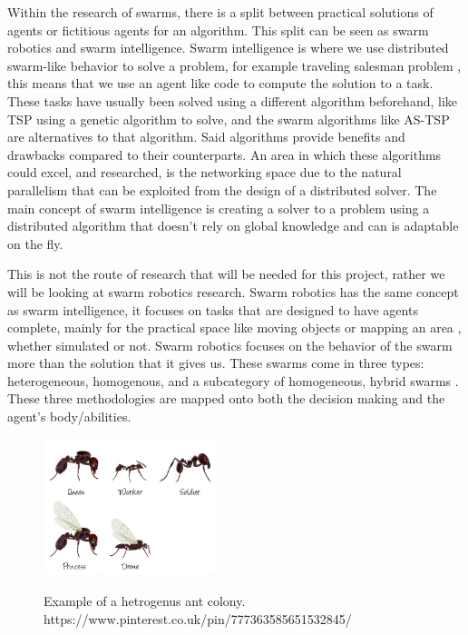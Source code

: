 \documentclass{UoYCSproject}
\begin{document}
Within the research of swarms, there is a split between practical solutions of agents or fictitious agents for an algorithm. 
This split can be seen as swarm robotics and swarm intelligence.
Swarm intelligence is where we use distributed swarm-like behavior to solve a problem, for example traveling salesman problem \cite{Swarm intellegiegence}, this means that we use an agent like code to compute the solution to a task.
These tasks have usually been solved using a different algorithm beforehand, like TSP using a genetic algorithm to solve, and the swarm algorithms like AS-TSP \cite{Swarm intellegiegence} are alternatives to that algorithm.
Said algorithms provide benefits and drawbacks compared to their counterparts. 
An area in which these algorithms could excel, and researched, is the networking space \cite{Swarm intellegiegence} due to the natural parallelism that can be exploited from the design of a distributed solver.
The main concept of swarm intelligence is creating a solver to a problem using a distributed algorithm that doesn't rely on global knowledge and can is adaptable on the fly.

This is not the route of research that will be needed for this project, rather we will be looking at swarm robotics research.
Swarm robotics has the same concept as swarm intelligence, it focuses on tasks that are designed to have agents complete, mainly for the practical space like moving objects or mapping an area \cite{Cognitive maps mine detection, Probabalitic automata foraging robots}, whether simulated or not.
Swarm robotics focuses on the behavior of the swarm more than the solution that it gives us.
These swarms come in three types: heterogeneous, homogenous, and a subcategory of homogeneous, hybrid swarms \cite{Swarm robotics reviewed}.
These three methodologies are mapped onto both the decision making and the agent's body/abilities.

\begin{figure}[htb]
\begin{center}
\label{fig:anthero}
\includegraphics[height=4cm]{"./AntHetro.png"}
\end{center}
\caption{Example of a hetrogenus ant colony. https://www.pinterest.co.uk/pin/777363585651532845/}
\end{figure}
\end{document}
